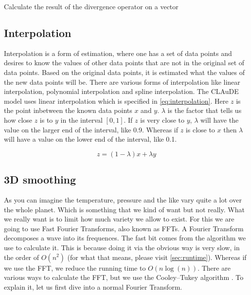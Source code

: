 \begin{algorithm}[!hbt]
     \;
    \caption{Calculate the result of the divergence operator on a vector}
    \label{alg:divergence}
\end{algorithm}

\subsection{Interpolation} \label{sec:interpolation}
Interpolation is a form of estimation, where one has a set of data points and desires to know the values of other data points that are not in the original set of data points\cite{interpolation}. 
Based on the original data points, it is estimated what the values of the new data points will be. There are various forms of interpolation like linear interpolation, polynomial interpolation 
and spline interpolation. The CLAuDE model uses linear interpolation which is specified in \autoref{eq:interpolation}. Here $z$ is the point inbetween the known data points $x$ and $y$. 
$\lambda$ is the factor that tells us how close $z$ is to $y$ in the interval $[0, 1]$. If $z$ is very close to $y$, $\lambda$ will have the value on the larger end of the interval, like 0.9.
Whereas if $z$ is close to $x$ then $\lambda$ will have a value on the lower end of the interval, like 0.1.

\begin{equation}
    z = (1 - \lambda)x + \lambda y
    \label{eq:interpolation}
\end{equation}

\subsection{3D smoothing} \label{sec:3dsmooth}
As you can imagine the temperature, pressure and the like vary quite a lot over the whole planet. Which is something that we kind of want but not really. What we really want is to limit how 
much variety we allow to exist. For this we are going to use Fast Fourier Transforms, also known as FFTs. A Fourier Transform decomposes a wave into its frequences. The fast bit comes from the 
algorithm we use to calculate it. This is because doing it via the obvious way is very slow, in the order of $O(n^2)$ (for what that means, please visit \autoref{sec:runtime}). Whereas if we use 
the FFT, we reduce the running time to $O(n\log(n))$. There are various ways to calculate the FFT, but we use the Cooley–Tukey algorithm \cite{fft}. To explain it, let us first dive into a normal 
Fourier Transform.

